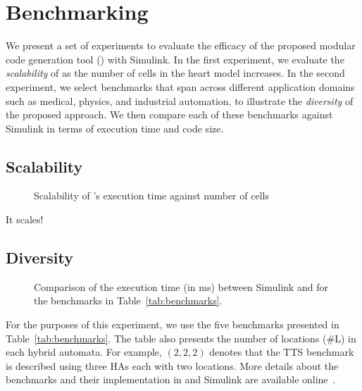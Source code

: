 \section{Benchmarking}
\label{sec:benchmarking}


We present a set of experiments to evaluate the efficacy of the proposed modular code generation tool (\ourTool) with Simulink\textsuperscript{\textregistered}. 
In the first experiment, we evaluate the \emph{scalability} of \ourTool as the number of cells in the heart model increases. 
In the second experiment, we select benchmarks that span across different application domains such as medical, physics, and industrial automation, to illustrate the \emph{diversity} of the proposed approach.
We then compare each of these benchmarks against Simulink\textsuperscript{\textregistered} in terms of execution time and code size.


\subsection{Scalability}

\begin{figure}[htbp]
	\centering
	
	\caption{Scalability of \ourTool's execution time against number of cells}
	\label{fig:scalability}
\end{figure}

It scales!

\subsection{Diversity}

\begin{figure}[htbp]
	\centering
	
	\caption{Comparison of the execution time (in ms) between Simulink\textsuperscript{\textregistered} and \ourTool for the benchmarks in Table~\ref{tab:benchmarks}.}
	\label{fig:executionTime}
\end{figure}

For the purposes of this experiment, we use the five benchmarks presented in Table~\ref{tab:benchmarks}.
The table also presents the number of locations (\#L) in each hybrid automata.
For example, $(2, 2, 2)$ denotes that the \acf{TTS} benchmark is described using three \acp{HA} each with two locations.
More details about the benchmarks and their implementation in \ourTool and Simulink\textsuperscript{\textregistered} are available online~\cite{githubBenchmarks}.

